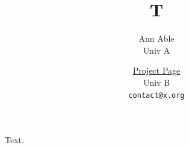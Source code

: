 \documentclass{article}
\title{T}
\author{Ann Able \\ Univ A \and \href{https://x.org/p}{Project Page} \\ Univ B \\ \texttt{contact@x.org}}
\begin{document}
\maketitle
Text.
\end{document}
